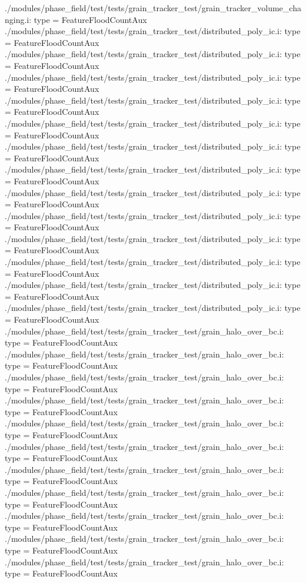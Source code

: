 ./modules/phase_field/test/tests/grain_tracker_test/grain_tracker_volume_changing.i:    type = FeatureFloodCountAux
./modules/phase_field/test/tests/grain_tracker_test/distributed_poly_ic.i:    type = FeatureFloodCountAux
./modules/phase_field/test/tests/grain_tracker_test/distributed_poly_ic.i:    type = FeatureFloodCountAux
./modules/phase_field/test/tests/grain_tracker_test/distributed_poly_ic.i:    type = FeatureFloodCountAux
./modules/phase_field/test/tests/grain_tracker_test/distributed_poly_ic.i:    type = FeatureFloodCountAux
./modules/phase_field/test/tests/grain_tracker_test/distributed_poly_ic.i:    type = FeatureFloodCountAux
./modules/phase_field/test/tests/grain_tracker_test/distributed_poly_ic.i:    type = FeatureFloodCountAux
./modules/phase_field/test/tests/grain_tracker_test/distributed_poly_ic.i:    type = FeatureFloodCountAux
./modules/phase_field/test/tests/grain_tracker_test/distributed_poly_ic.i:    type = FeatureFloodCountAux
./modules/phase_field/test/tests/grain_tracker_test/distributed_poly_ic.i:    type = FeatureFloodCountAux
./modules/phase_field/test/tests/grain_tracker_test/distributed_poly_ic.i:    type = FeatureFloodCountAux
./modules/phase_field/test/tests/grain_tracker_test/distributed_poly_ic.i:    type = FeatureFloodCountAux
./modules/phase_field/test/tests/grain_tracker_test/distributed_poly_ic.i:    type = FeatureFloodCountAux
./modules/phase_field/test/tests/grain_tracker_test/distributed_poly_ic.i:    type = FeatureFloodCountAux
./modules/phase_field/test/tests/grain_tracker_test/grain_halo_over_bc.i:    type = FeatureFloodCountAux
./modules/phase_field/test/tests/grain_tracker_test/grain_halo_over_bc.i:    type = FeatureFloodCountAux
./modules/phase_field/test/tests/grain_tracker_test/grain_halo_over_bc.i:    type = FeatureFloodCountAux
./modules/phase_field/test/tests/grain_tracker_test/grain_halo_over_bc.i:    type = FeatureFloodCountAux
./modules/phase_field/test/tests/grain_tracker_test/grain_halo_over_bc.i:    type = FeatureFloodCountAux
./modules/phase_field/test/tests/grain_tracker_test/grain_halo_over_bc.i:    type = FeatureFloodCountAux
./modules/phase_field/test/tests/grain_tracker_test/grain_halo_over_bc.i:    type = FeatureFloodCountAux
./modules/phase_field/test/tests/grain_tracker_test/grain_halo_over_bc.i:    type = FeatureFloodCountAux
./modules/phase_field/test/tests/grain_tracker_test/grain_halo_over_bc.i:    type = FeatureFloodCountAux
./modules/phase_field/test/tests/grain_tracker_test/grain_halo_over_bc.i:    type = FeatureFloodCountAux
./modules/phase_field/test/tests/grain_tracker_test/grain_halo_over_bc.i:    type = FeatureFloodCountAux
